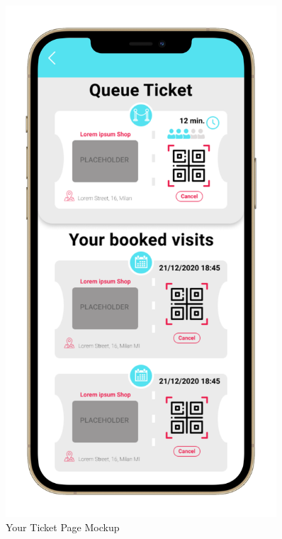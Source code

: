 \begin{figure}
    \centering
    \begin{minipage}{.45\linewidth}
    \includegraphics[width=0.9\textwidth]{Images/UserInterfaces/withiphonephrames/YourTicketPage_iphone12promaxgold_portrait.png}
    \caption{\label{fig:InterfacesDiagram}{Your Ticket Page Mockup}}
\end{minipage}
\hspace{.05\linewidth}
\begin{minipage}{.45\linewidth}

\end{minipage}
\end{figure}
